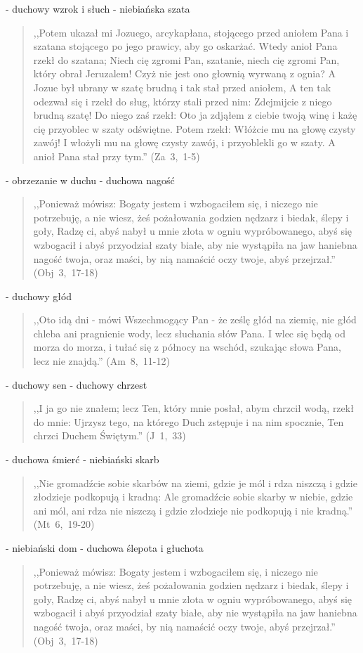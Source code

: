 \documentclass[10pt,a4paper,oneside]{article}
\begin{document}
- duchowy wzrok i słuch
- niebiańska szata
\begin{quote}
,,Potem ukazał mi Jozuego, arcykapłana, stojącego przed aniołem Pana i szatana stojącego po jego prawicy, aby go oskarżać. Wtedy anioł Pana rzekł do szatana; Niech cię zgromi Pan, szatanie, niech cię zgromi Pan, który obrał Jeruzalem! Czyż nie jest ono głownią wyrwaną z ognia? A Jozue był ubrany w szatę brudną i tak stał przed aniołem, A ten tak odezwał się i rzekł do sług, którzy stali przed nim: Zdejmijcie z niego brudną szatę! Do niego zaś rzekł: Oto ja zdjąłem z ciebie twoją winę i każę cię przyoblec w szaty odświętne. Potem rzekł: Włóżcie mu na głowę czysty zawój! I włożyli mu na głowę czysty zawój, i przyoblekli go w szaty. A anioł Pana stał przy tym.'' (Za~3,~1-5)
\end{quote}
- obrzezanie w duchu
- duchowa nagość
\begin{quote}
,,Ponieważ mówisz: Bogaty jestem i wzbogaciłem się, i niczego nie potrzebuję, a nie wiesz, żeś pożałowania godzien nędzarz i biedak, ślepy i goły, Radzę ci, abyś nabył u mnie złota w ogniu wypróbowanego, abyś się wzbogacił i abyś przyodział szaty białe, aby nie wystąpiła na jaw haniebna nagość twoja, oraz maści, by nią namaścić oczy twoje, abyś przejrzał.'' (Obj~3,~17-18)
\end{quote}
- duchowy głód
\begin{quote}
,,Oto idą dni - mówi Wszechmogący Pan - że ześlę głód na ziemię, nie głód chleba ani pragnienie wody, lecz słuchania słów Pana. I wlec się będą od morza do morza, i tułać się z północy na wschód, szukając słowa Pana, lecz nie znajdą.'' (Am~8,~11-12)
\end{quote}
- duchowy sen
- duchowy chrzest
\begin{quote}
,,I ja go nie znałem; lecz Ten, który mnie posłał, abym chrzcił wodą, rzekł do mnie: Ujrzysz tego, na którego Duch zstępuje i na nim spocznie, Ten chrzci Duchem Świętym.'' (J~1,~33)
\end{quote}
- duchowa śmierć
- niebiański skarb
\begin{quote}
,,Nie gromadźcie sobie skarbów na ziemi, gdzie je mól i rdza niszczą i gdzie złodzieje podkopują i kradną: Ale gromadźcie sobie skarby w niebie, gdzie ani mól, ani rdza nie niszczą i gdzie złodzieje nie podkopują i nie kradną.'' (Mt~6,~19-20)
\end{quote}
- niebiański dom
- duchowa ślepota i głuchota
\begin{quote}
,,Ponieważ mówisz: Bogaty jestem i wzbogaciłem się, i niczego nie potrzebuję, a nie wiesz, żeś pożałowania godzien nędzarz i biedak, ślepy i goły, Radzę ci, abyś nabył u mnie złota w ogniu wypróbowanego, abyś się wzbogacił i abyś przyodział szaty białe, aby nie wystąpiła na jaw haniebna nagość twoja, oraz maści, by nią namaścić oczy twoje, abyś przejrzał.'' (Obj~3,~17-18)
\end{quote}
\end{document}
